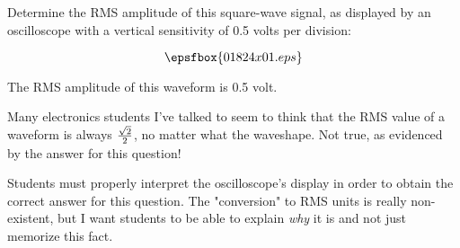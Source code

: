 

Determine the RMS amplitude of this square-wave signal, as displayed by an oscilloscope with a vertical sensitivity of 0.5 volts per division:

$$\epsfbox{01824x01.eps}$$







The RMS amplitude of this waveform is 0.5 volt.







Many electronics students I've talked to seem to think that the RMS value of a waveform is always ${\sqrt{2} \over 2}$, no matter what the waveshape.  Not true, as evidenced by the answer for this question!

Students must properly interpret the oscilloscope's display in order to obtain the correct answer for this question.  The "conversion" to RMS units is really non-existent, but I want students to be able to explain {\it why} it is and not just memorize this fact.




